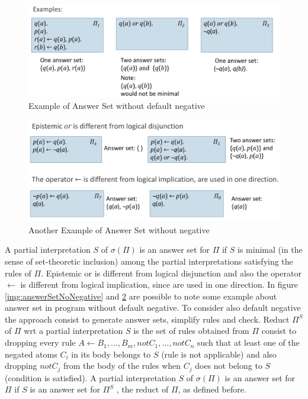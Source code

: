 \begin{figure}
	\includegraphics[width=\textwidth]{Images/answerSetNotNegative}
	\caption{Example of Answer Set without default negative}
	\label{img:answerSetNotNegative}
\end{figure}
\begin{figure}
	\includegraphics[width=\textwidth]{Images/answerSetMoreEx}
	\caption{Another Example of Answer Set without negative}
	\label{img:answerSetMoreEx}
\end{figure}
A partial interpretation $S$ of $\sigma(\Pi)$ is an answer set for $\Pi$ if $S$ is
minimal (in the sense of set-theoretic inclusion) among the partial interpretations
satisfying the rules of $\Pi$.\newline
Epistemic or is different from logical disjunction and also the operator $\gets$ is different
from logical implication, since are used in one direction.\newline
In figure \ref{img:answerSetNoNegative} and \ref{img:answerSetMoreEx} are possible to note
some example about answer set in program without default negative.\newline
To consider also default negative the approach consist to generate answer sets, simplify 
rules and check.\newline
Reduct $\Pi^S$ of $\Pi$ wrt a partial interpretation $S$ is the set of rules 
obtained from $\Pi$ consist to dropping every rule 
$A \gets B_1, \dots, B_m, not C_1, \dots, not C_n$ such that at least one of the negated 
atoms $C_i$ in its body belongs to $S$ (rule is not applicable) and also 
dropping $not C_j$ from the body of the rules when $C_j$ does not belong to $S$
(condition is satisfied).\newline
A partial interpretation $S$ of $\sigma(\Pi)$ is an answer set for $\Pi$ if $S$ 
is an answer set for $\Pi^S$ , the reduct of $\Pi$, as defined before.


